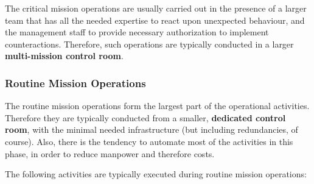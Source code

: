 The critical mission operations are usually carried out in the presence of a larger team that has all the needed expertise to react upon unexpected behaviour, and the management staff to provide necessary authorization to implement counteractions. Therefore, such operations are typically conducted in a larger \textbf{multi-mission control room}.

\subsubsection{Routine Mission Operations}

The routine mission operations form the largest part of the operational activities. Therefore they are typically conducted from a smaller, \textbf{dedicated control room}, with the minimal needed infrastructure (but including redundancies, of course). Also, there is the tendency to automate most of the activities in this phase, in order to reduce manpower and therefore costs.

The following activities are typically executed during routine mission operations:

